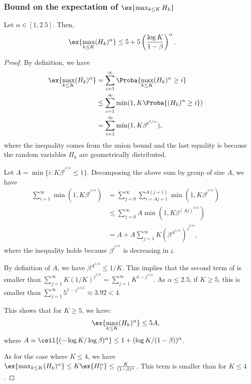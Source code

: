 \subsubsection{Bound on the expectation of $\ex{\max_{k\le K}H_k}$}

\begin{lem}
    \label{lem:moment}
    Let $\alpha\in[1,2.5]$. Then,
    \begin{align}
        \label{eq:lemma_HK}
        \ex{\max_{k\le K}(H_k)^\alpha} &\le 5+5\left(\frac{\log K}{1-\beta}\right)^\alpha.
    \end{align}
 \end{lem}
 \begin{proof}
    By definition, we have
    \begin{align*}
        \ex{\max_{k\le K}(H_k)^\alpha} &=  \sum_{i=1}^\infty \Proba{ \max_{k\le K}(H_k)^\alpha \ge i}\\
        &\le \sum_{i=1}^\infty \min(1, K \Proba{ (H_k)^\alpha \ge i})\\
        &= \sum_{i=1}^\infty \min(1, K \beta^{i^{1/\alpha}}),
    \end{align*}
    where the inequality comes from the union bound and the last equality is because the random variables $H_k$ are geometrically distributed.
 
    Let $A=\min\{i : K \beta^{i^{1/\alpha}}\le 1\}$. Decomposing the above sum by group of size $A$, we have
    \begin{align}
        \sum_{i=1}^\infty \min(1, K \beta^{i^{1/\alpha}})
        &= \sum_{j=0}^\infty \sum_{i=Aj+1}^{A(j+1)}\min(1, K \beta^{i^{1/\alpha}})\nonumber\\
        &\le \sum_{j=0}^\infty A \min(1, K \beta^{(Aj)^{1/\alpha}})\nonumber\\
        &= A + A\sum_{j=1}^\infty K (\beta^{A^{1/\alpha}})^{j^{1/\alpha}},
        \label{eq:sum_A}
    \end{align}
    where the inequality holds because $\beta^{i^{1/\alpha}}$ is decreasing in $i$. 
 
    By definition of $A$, we have $\beta^{A^{1/\alpha}}\le 1/K$. This implies that the second term of  is smaller than $\sum_{j=1}^\infty K (1/K)^{j^{1/\alpha}}=\sum_{j=1}^\infty K^{1-j^{1/\alpha}}$. As $\alpha\le 2.5$, if  $K\ge5$, this is smaller than $\sum_{j=1}^\infty 5^{1-j^{1/2.5}}\approx 3.92<4$.
 
    This shows that for $K\ge5$, we have:
    \begin{align*}
        \ex{\max_{k\le K}(H_k)^\alpha} \le 5A,
    \end{align*}
    where $A=\ceil{(-\log K/\log \beta)^{\alpha}}\le 1+(\log K/(1-\beta ))^\alpha$.
 
    As for the case where $K\le4$, we have $\ex{\max_{k\le K}(H_k)^\alpha}\le K\ex{H_1^\alpha}\le \frac{K}{(1-\beta)^{\alpha}}$. This term is smaller than  for $K\le4$.
 \end{proof}


